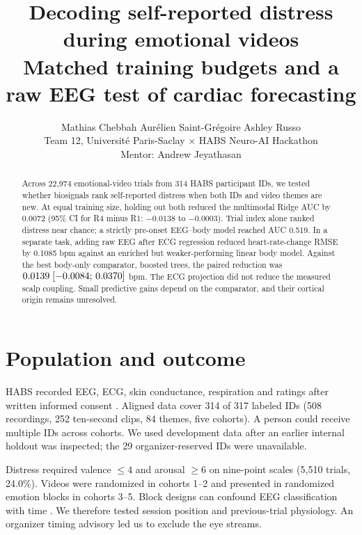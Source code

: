\documentclass[10pt,a4paper]{article}
\title{\vspace{-2em}\Large\bfseries\color{ink} Decoding self-reported distress during emotional videos\\[2pt]\large Matched training budgets and a raw EEG test of cardiac forecasting}
\author{\normalsize Mathias Chebbah \quad Aurélien Saint-Grégoire \quad Ashley Russo\\\small Team 12, Université Paris-Saclay $\times$ HABS Neuro-AI Hackathon\\\small Mentor: Andrew Jeyathasan}
\date{}
\begin{document}
\maketitle\vspace{-1.5em}
\begin{abstract}\noindent
Across 22,974 emotional-video trials from 314 HABS participant IDs, we tested whether biosignals rank self-reported distress when both IDs and video themes are new. At equal training size, holding out both reduced the multimodal Ridge AUC by 0.0072 (95\% CI for R4 minus R1: $-0.0138$ to $-0.0003$). Trial index alone ranked distress near chance; a strictly pre-onset EEG--body model reached AUC 0.519. In a separate task, adding raw EEG after ECG regression reduced heart-rate-change RMSE by 0.1085 bpm against an enriched but weaker-performing linear body model. Against the best body-only comparator, boosted trees, the paired reduction was $0.0139\;[-0.0084;\,0.0370]$ bpm. The ECG projection did not reduce the measured scalp coupling. Small predictive gains depend on the comparator, and their cortical origin remains unresolved.
\end{abstract}
\section{Population and outcome}
HABS recorded EEG, ECG, skin conductance, respiration and ratings after written informed consent \cite{habs}. Aligned data cover 314 of 317 labeled IDs (508 recordings, 252 ten-second clips, 84 themes, five cohorts). A person could receive multiple IDs across cohorts. We used development data after an earlier internal holdout was inspected; the 29 organizer-reserved IDs were unavailable.

Distress required valence $\le4$ and arousal $\ge6$ on nine-point scales (5,510 trials, 24.0\%). Videos were randomized in cohorts 1--2 and presented in randomized emotion blocks in cohorts 3--5. Block designs can confound EEG classification with time \cite{li}. We therefore tested session position and previous-trial physiology. An organizer timing advisory led us to exclude the eye streams.
\end{document}
